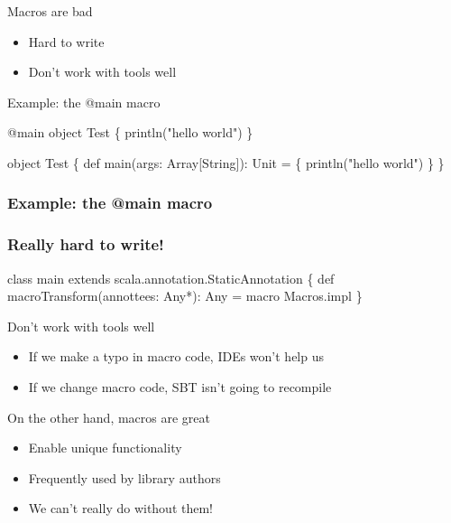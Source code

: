 \documentclass[svgnames,dvipsnames,hyperref={bookmarks=false},usepdftitle=false]{beamer}
\begin{document}
\begin{frame}{Macros are bad}
\begin{itemize}
\item Hard to write
\item Don't work with tools well
\end{itemize}
\end{frame}

\begin{frame}[fragile]{Example: the @main macro}
\begin{semiverbatim}
@main object Test \{
  println("hello world")
\}

                          \arrowdown

object Test \{
  def main(args: Array[String]): Unit = \{
    println("hello world")
  \}
\}
\end{semiverbatim}
\end{frame}

\begin{frame}[fragile]
\frametitle<1,2>{Example: the @main macro}
\frametitle<3->{Really hard to write!}
\begin{semiverbatim}
class main extends scala.annotation.StaticAnnotation \{
  \alert<3>{def macroTransform(annottees: Any*): Any =}
    \alert<3>{macro Macros.impl}
\}

\end{semiverbatim}
\end{frame}

\begin{frame}{Don't work with tools well}
\begin{itemize}
\item If we make a typo in macro code, IDEs won't help us
\item If we change macro code, SBT isn't going to recompile
\end{itemize}
\end{frame}

\begin{frame}{On the other hand, macros are great}
\begin{itemize}
\item Enable unique functionality
\item Frequently used by library authors
\item We can't really do without them!
\end{itemize}
\end{frame}
\end{document}
